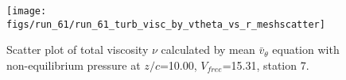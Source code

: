 \begin{figure}[H]
\centering
\texttt{[image: figs/run\_61/run\_61\_turb\_visc\_by\_vtheta\_vs\_r\_meshscatter]}
\caption{Scatter plot of total viscosity $\nu$ calculated by mean $\bar{v}_{\theta}$ equation with non-equilibrium pressure at $z/c$=10.00, $V_{free}$=15.31, station 7.}
\label{fig:run_61_turb_visc_by_vtheta_vs_r_meshscatter}
\end{figure}


